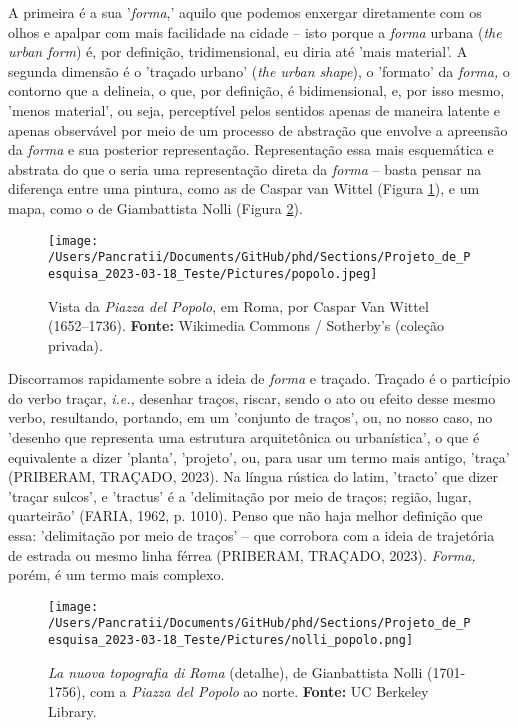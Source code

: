 \documentclass[]{report}
\begin{document}
	A primeira é a sua '\textit{forma},' aquilo que podemos enxergar diretamente com os olhos e apalpar com mais facilidade na cidade – isto porque a \textit{forma} urbana (\textit{the urban form}) é, por definição, tridimensional, eu diria até 'mais material'. A segunda dimensão é o 'traçado urbano' (\textit{the urban shape}), o 'formato' da \textit{forma,} o contorno que a delineia, o que, por definição, é bidimensional, e, por isso mesmo, 'menos material', ou seja, perceptível pelos sentidos apenas de maneira latente e apenas observável por meio de um processo de abstração que envolve a apreensão da \textit{forma} e sua posterior representação. Representação essa mais esquemática e abstrata do que o seria uma representação direta da \textit{forma} – basta pensar na diferença entre uma pintura, como as de Caspar van Wittel (Figura \ref{fig:popolo}), e um mapa, como o de Giambattista Nolli (Figura \ref{fig:nolli_popolo}).

\begin{figure}[h]
	\centering
	\texttt{[image: /Users/Pancratii/Documents/GitHub/phd/Sections/Projeto\_de\_Pesquisa\_2023-03-18\_Teste/Pictures/popolo.jpeg]} 
	\captionsetup{labelfont=bf}
	\caption{Vista da \textit{Piazza del Popolo}, em Roma, por Caspar Van Wittel (1652–1736). \textbf{Fonte:} Wikimedia Commons / Sotherby's (coleção privada).}
	\label{fig:popolo}
\end{figure}   

Discorramos rapidamente sobre a ideia de \textit{forma} e traçado. Traçado é o particípio do verbo traçar, \textit{i.e.,} desenhar traços, riscar, sendo o ato ou efeito desse mesmo verbo, resultando, portando, em um 'conjunto de traços', ou, no nosso caso, no 'desenho que representa uma estrutura arquitetônica ou urbanística', o que é equivalente a dizer 'planta', 'projeto', ou, para usar um termo mais antigo, 'traça' (PRIBERAM, TRAÇADO, 2023). Na língua rústica do latim, 'tracto' que dizer 'traçar sulcos', e 'tractus' é a 'delimitação por meio de traços; região, lugar, quarteirão' (FARIA, 1962, p. 1010). Penso que não haja melhor definição que essa: 'delimitação por meio de traços' – que corrobora com a ideia de trajetória de estrada ou mesmo linha férrea (PRIBERAM, TRAÇADO, 2023). \textit{Forma,} porém, é um termo mais complexo.

 \begin{figure}
	\centering
	\texttt{[image: /Users/Pancratii/Documents/GitHub/phd/Sections/Projeto\_de\_Pesquisa\_2023-03-18\_Teste/Pictures/nolli\_popolo.png]}
	\captionsetup{labelfont=bf}
	\caption{\textit{La nuova topografia di Roma} (detalhe), de Gianbattista Nolli (1701-1756), com a \textit{Piazza del Popolo} ao norte. \textbf{Fonte:} UC Berkeley Library.}
	\label{fig:nolli_popolo}
\end{figure} 
\end{document}
